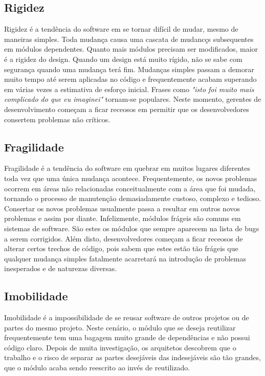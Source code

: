 \subsection{Rigidez}
\label{subsec:rigidez}

Rigidez é a tendência do software em se tornar difícil de mudar, mesmo de maneiras simples. Toda mudança causa uma cascata de mudancçs subsequentes em módulos dependentes. Quanto mais módulos precisam ser modificados, maior é a rigidez do design. Quando um design está muito rígido, não se sabe com segurança quando uma mudança terá fim. Mudanças simples passam a demorar muito tempo até serem aplicadas no código e frequentemente acabam superando em várias vezes a estimativa de esforço inicial. Frases como \textit{"isto foi muito mais complicado do que eu imaginei"} tornam-se populares. Neste momento, gerentes de desenvolvimento começam a ficar receosos em permitir que os desenvolvedores consertem problemas não críticos.


\subsection{Fragilidade}
\label{subsec:fragilidade}

Fragilidade é a tendência do software em quebrar em muitos lugares diferentes toda vez que uma única mudança acontece. Frequentemente, os novos problemas ocorrem em áreas não relacionadas conceitualmente com a área que foi mudada, tornando o processo de manutenção demasiadamente custoso, complexo e tedioso. Consertar os novos problemas usualmente passa a resultar em outros novos problemas e assim por diante. Infelizmente, módulos frágeis são comuns em sistemas de software. São estes os módulos que sempre aparecem na lista de bugs a serem corrigidos. Além disto, desenvolvedores começam a ficar receosos de alterar certos trechos de código, pois sabem que estes estão tão frágeis que qualquer mudança simples fatalmente acarretará na introdução de problemas inesperados e de naturezas diversas. 


\subsection{Imobilidade}

Imobilidade é a impossibilidade de se reusar software de outros projetos ou de partes do mesmo projeto. Neste cenário, o módulo que se deseja reutilizar frequentemente tem uma bagagem muito grande de dependências e não possui código claro. Depois de muita investigação, os arquitetos descobrem que o trabalho e o risco de separar as partes desejáveis das indesejáveis são tão grandes, que o módulo acaba sendo reescrito ao invés de reutilizado.

